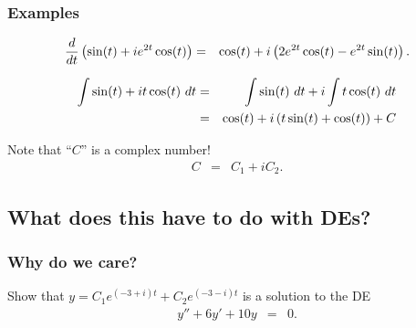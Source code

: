 \begin{frame}
  \frametitle{Examples}

  \begin{eqnarray*}
    \frac{d}{dt} \left( \sin(t) + i e^{2t} \cos(t) \right) & = &
    \cos(t) + i \left( 2 e^{2t} \cos(t) - e^{2t} \sin(t) \right).
  \end{eqnarray*}

  \begin{eqnarray*}
    \int \sin(t) + i t \cos(t) ~ dt & = &
    \int \sin(t) ~ dt + i \int t \cos(t) ~ dt \\
    & = & \cos(t) + i \left( t\sin(t) + \cos(t) \right) + C
  \end{eqnarray*}

  Note that ``$C$'' is a complex number!
  \begin{eqnarray*}
    C & = & C_1 + i C_2.
  \end{eqnarray*}

\end{frame}

\subsection{What does this have to do with DEs?}

\begin{frame}
  \frametitle{Why do we care?}

  Show that $y=C_1 e^{(-3+i)t} + C_2 e^{(-3-i)t}$ is a solution to the DE
  \begin{eqnarray*}
    y'' + 6y' + 10y & = & 0.
  \end{eqnarray*}

\end{frame}


